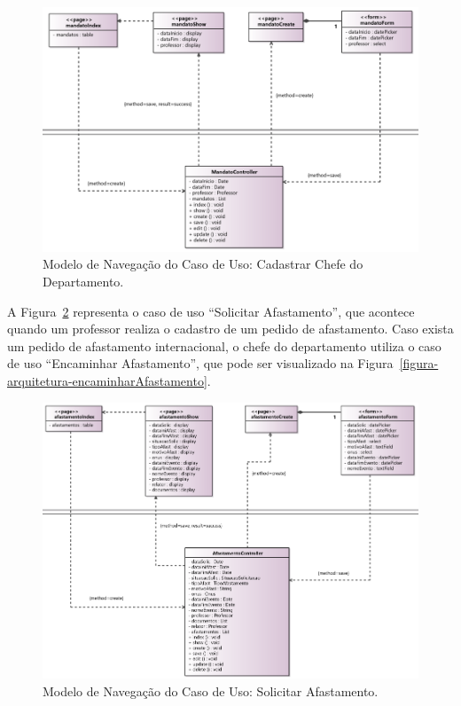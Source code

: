 \begin{figure}[h]
	\centering
	\includegraphics[width=1\textwidth]{figuras/figura-arquitetura-cadastrarChefeDepartamento.png}
	\caption{Modelo de Navegação do Caso de Uso: Cadastrar Chefe do Departamento.}
	\label{figura-arquitetura-cadastrarChefeDepartamento}
\end{figure}

A Figura~\ref{figura-arquitetura-solicitarAfastamento} representa o caso de uso ``Solicitar Afastamento'', que acontece quando um professor realiza o cadastro de um pedido de afastamento. Caso exista um pedido de afastamento internacional, o chefe do departamento utiliza o caso de uso ``Encaminhar Afastamento'', que pode ser visualizado na Figura~\ref{figura-arquitetura-encaminharAfastamento}. 

\begin{figure}[h]
	\centering
	\includegraphics[width=1\textwidth]{figuras/figura-arquitetura-solicitarAfastamento.png}
	\caption{Modelo de Navegação do Caso de Uso: Solicitar Afastamento.}
	\label{figura-arquitetura-solicitarAfastamento}
\end{figure}

